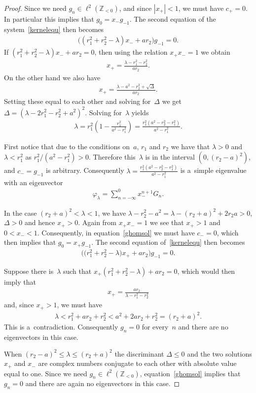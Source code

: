\documentclass[pdftex]{sigma}
\numberwithin{equation}{section}
\begin{document}
\begin{proof}
Since we need $g_n\in\ell^2({\mathbb Z}_{<0})$, and since $|x_+|<1$, we must have $c_+=0$.
In particular this implies that $g_0=x_-g_{-1}$.
The second equation of the system~\eqref{kernelequ} then becomes
\begin{gather*}
\big((r_1^2+r_2^2-\lambda)x_-+ar_2\big)g_{-1} =0.
\end{gather*}
If $(r_1^2+ r_2^2-\lambda)x_-+ar_2=0$, then using the relation $x_+x_- =1$ we obtain
\begin{gather*}
x_+=\frac{\lambda-r_1^2-r_2^2}{ar_2}.
\end{gather*}
On the other hand we also have
\begin{gather*}
x_+=\frac{\lambda-a^2-r_2^2+\sqrt{\Delta}}{ar_2}.
\end{gather*}
Setting these equal to each other and solving for~$\Delta$ we get $\Delta=(\lambda-2r_1^2-r_2^2+a^2)^2$.
Solving for~$\lambda$ yields
\begin{gather*}
\lambda=r_1^2\left(1-\frac{r_1^2}{a^2- r_1^2}\right)=\frac{r_1^2(a^2-r_2^2-r_1^2)}{a^2-r_1^2}.
\end{gather*}

First notice that due to the conditions on~$a$, $r_1$ and $r_2$ we have that $\lambda>0$ and $\lambda <r_1^2$ as
$r_1^2/(a^2-r_1^2)>0$.
Therefore this~$\lambda$ is in the interval $(0,(r_2-a)^2)$, and $c_-=g_{-1}$ is arbitrary.
Consequently $\lambda =\frac{r_1^2(a^2-r_2^2-r_1^2)}{a^2-r_1^2}$ is a~simple eigenvalue with an eigenvector
\begin{gather*}
\varphi_\lambda=\sum\limits_{n=-\infty}^0x_-^{n+1}G_n.
\end{gather*}

In the case $(r_2+a)^2<\lambda<1$, we have $\lambda-r_2^2-a^2=\lambda-(r_2+a)^2+2r_2a>0$, $\Delta>0$ and hence $x_+>0$.
Again from $x_+x_-=1$ we see that $x_+>1$ and $0<x_-<1$.
Consequently, in equation~\eqref{ghomsol} we must have $c_-=0$, which then implies that $g_0=x_+g_{-1}$.
The second equation of~\eqref{kernelequ} then becomes
\begin{gather*}
\big(\big(r_1^2+r_2^2-\lambda\big)x_++ar_2\big)g_{-1} =0.
\end{gather*}

Suppose there is~$\lambda$ such that $x_+(r_1^2+ r_2^2-\lambda)+ar_2=0$, which would then imply that
\begin{gather*}
x_+=\frac{ar_2}{\lambda-r_1^2-r_2^2}
\end{gather*}
and, since $x_+>1$, we must have
\begin{gather*}
\lambda < r_1^2+ar_2+r_2^2 < a^2+2ar_2+r_2^2=(r_2+a)^2.
\end{gather*}
This is a~contradiction.
Consequently $g_{n}=0$ for every~$n$ and there are no eigenvectors in this case.

When $(r_2-a)^2\leq\lambda\leq (r_2+a)^2$ the discriminant $\Delta\leq 0$ and the two solutions $x_+$ and $x_-$ are
complex numbers conjugate to each other with absolute value equal to one.
Since we need $g_n\in\ell^2({\mathbb Z}_{<0})$, equation~\eqref{ghomsol} implies that $g_{n}=0$ and there are again no
eigenvectors in this case.
\end{proof}
\end{document}
